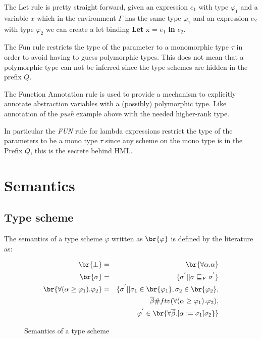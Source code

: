 The Let rule is pretty straight forward, given an expression $e_1$ with type $\varphi_1$ and a variable $x$ which in the environment $\Gamma$ has the same type $\varphi_1$ and an expression $e_2$ with type $\varphi_2$ we can create a let binding \textbf{Let} x = $e_1$ \textbf{in} $e_2$.

\begin{prooftree}
\end{prooftree}

The Fun rule restricts the type of the parameter to a monomorphic type $\tau$ in order to avoid having to guess polymorphic types. This does not mean that a polymorphic type can not be inferred since the type schemes are hidden in the prefix $Q$.

\begin{prooftree}
\end{prooftree}

The Function Annotation rule is used to provide a mechanism to explicitly annotate abstraction variables with a (possibly) polymorphic type. Like annotation of the \textit{push} example above with the needed higher-rank type.

In particular the \textit{FUN} rule for lambda expressions restrict the type of the parameters to be a mono type $\tau$ since any scheme on the mono type is in the Prefix $Q$, this is the secrete behind HML.
\section{Semantics}
\subsection{Type scheme}
The semantics of a type scheme $\varphi$ written as $\br{\varphi}$  is defined by the literature as:
\begin{figure}[H]
\begin{eqnarray*}
\br{\bot} & = & \br{\forall\alpha . \alpha} \\
\br{\sigma} & = & \{ \sigma^{'} || \sigma \sqsubseteq_F \sigma^{'} \} \\
\br{\forall(\alpha \geq \varphi_1).\varphi_2} & = & \{ \sigma^{'} || \sigma_1  \in \br{\varphi_1}, \sigma_2 \in \br{\varphi_2}, \\ 
   &\mbox{   }& \mbox{   } \overline{\beta} \# ftv(\forall(\alpha \geq \varphi_1).\varphi_2), \\
   &\mbox{   }& \mbox{   } \varphi^{'} \in \br{\forall\overline{\beta}.\lbrack \alpha := \sigma_1 \rbrack\sigma_2}  \} 
\end{eqnarray*}
\caption{Semantics of a type scheme}
\end{figure}


